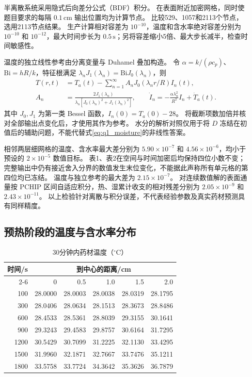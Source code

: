 半离散系统采用隐式后向差分公式（BDF）积分。
在表面附近加密网格，同时使题目要求的每隔 $0.1\,\mathrm{cm}$ 输出位置均为计算节点。
比较529、1057和2113个节点，选用2113节点结果。
生产计算相对容差为 $10^{-10}$，温度和含水率绝对容差分别为 $10^{-10}$ 和 $10^{-12}$，最大时间步长为 $0.5\,\mathrm s$；另将容差缩小5倍、最大步长减半，检查时间敏感性。

温度的独立线性参考由分离变量与 Duhamel 叠加构造。
令 $\alpha=k/(\rho c_p)$、$\mathrm{Bi}=hR/k$，特征根满足
$\lambda_nJ_1(\lambda_n)=\mathrm{Bi}J_0(\lambda_n)$，则
\begin{align}
T(r,t)&=T_a(t)-\sum_{n=1}^{\infty}A_nJ_0(\lambda_nr/R)I_n(t),\\
A_n&=\frac{2J_1(\lambda_n)}{\lambda_n[J_0(\lambda_n)^2+J_1(\lambda_n)^2]},
\qquad \dot I_n=-\frac{\alpha\lambda_n^2}{R^2}I_n+\dot T_a(t).
\end{align}
其中 $J_0,J_1$ 为第一类 Bessel 函数，$I_n(0)=T_a(0)-28$。
将截断项数加倍并核对全部输出点变化后，才使用其作为参考。
水分的解析对照仅用于将 $D$ 冻结在初值后的辅助问题，不能代替式\eqref{eq:q1_moisture}的非线性答案。

相邻两层细网格的温度、含水率最大差分别为 $5.90\times10^{-7}$ 和 $4.56\times10^{-6}$，均小于预设的 $2\times10^{-5}$ 数值目标。
表1、表2在空间与时间加密后均保持四位小数不变；完整输出中仍有接近舍入分界的数值发生末位变化，不能据此声称所有单元格的第四位均已冻结。
温度与独立参考的最大差为 $2.15\times10^{-7}$。
对连续数值解的表面通量按 PCHIP 区间自适应积分，热、湿累计收支的相对残差分别为 $2.05\times10^{-9}$ 和 $2.43\times10^{-11}$。
以上检验针对离散与积分误差，不代表经验参数及真实药材预测具有同样精度。

\subsection{预热阶段的温度与含水率分布}

\begin{table}[H]
\centering
\caption{30分钟内药材温度（$^\circ\mathrm C$）}\label{tab:q1_T}
\small
\begin{tabular}{rrrrrr}
\toprule
时间/s & \multicolumn{5}{c}{到中心的距离/cm}\\
\cmidrule(lr){2-6}
 & 0 & 0.5 & 1.0 & 1.5 & 2.0\\
\midrule
100 & 28.0000 & 28.0003 & 28.0038 & 28.0319 & 28.1795 \\
300 & 28.0406 & 28.0634 & 28.1513 & 28.3673 & 28.8486 \\
600 & 28.4533 & 28.5361 & 28.8039 & 29.3155 & 30.1641 \\
900 & 29.3243 & 29.4583 & 29.8757 & 30.6164 & 31.7295 \\
1200 & 30.5429 & 30.7099 & 31.2225 & 32.1130 & 33.4295 \\
1500 & 31.9960 & 32.1871 & 32.7667 & 33.7476 & 35.1211 \\
1800 & 33.5758 & 33.7724 & 34.3642 & 35.3626 & 36.7879 \\
\bottomrule
\end{tabular}
\end{table}


